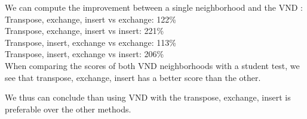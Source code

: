 \documentclass[a4paper]{article}
\begin{document}
We can compute the improvement between a single neighborhood and the VND : \\
Transpose, exchange, insert vs exchange: 122\% \\
Transpose, exchange, insert vs insert: 221\%   \\
Transpose, insert, exchange vs exchange: 113\% \\
Transpose, insert, exchange vs insert: 206\%   \\

When comparing the scores of both VND neighborhoods with a student test, we see that
transpose, exchange, insert has a better score than the other.

We thus can conclude than using VND with the transpose, exchange, insert is preferable over the other methods.
\end{document}
